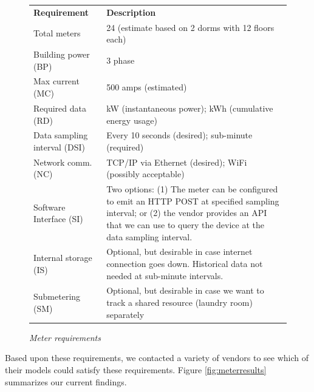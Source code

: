 \documentclass[11pt]{article}
\begin{document}
\begin{figure}[!ht]
\small
\begin{tabular}{p{1.75in}p{4.25in}} \hline
{\bf Requirement} & {\bf Description}  \\
Total meters & 24 (estimate based on 2 dorms with 12 floors each) \\ 

Building power (BP) & 3 phase \\  

Max current (MC) & 500 amps (estimated)  \\ 

Required data (RD) & kW (instantaneous power); kWh (cumulative energy usage) \\ 

Data sampling interval (DSI) & Every 10 seconds (desired); sub-minute (required) \\ 

Network comm. (NC) & TCP/IP via Ethernet (desired); WiFi (possibly acceptable) \\ 

Software Interface (SI) & Two options: (1) The meter can be configured to emit
an HTTP POST at specified sampling interval; or (2) the vendor provides an
API that we can use to query the device at the data sampling interval. \\ 

Internal storage (IS) & Optional, but desirable in case internet connection
goes down. Historical data not needed at sub-minute intervals. \\ 

Submetering (SM) & Optional, but desirable in case we want to track a shared
resource (laundry room) separately \\ \hline

\end{tabular} 
\normalsize
\caption{{\em Meter requirements}}
\label{fig:meterrequirements}
\end{figure}

Based upon these requirements, we contacted a variety of vendors to see
which of their models could satisfy these requirements.  Figure
\ref{fig:meterresults} summarizes our current findings.  
\end{document}
